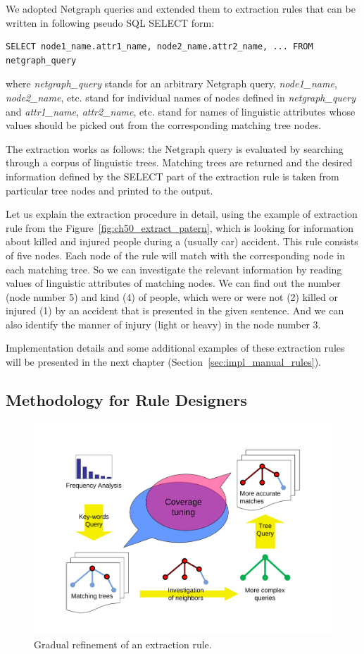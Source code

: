 We adopted Netgraph queries and extended them to extraction rules that can be written in following pseudo SQL SELECT form:

\begin{verbatim}
SELECT node1_name.attr1_name, node2_name.attr2_name, ... FROM netgraph_query
\end{verbatim}

where \emph{netgraph\_query} stands for an arbitrary Netgraph query, \emph{node1\_name}, \emph{node2\_name}, etc. stand for individual names of nodes defined in \emph{netgraph\_query} and \emph{attr1\_name}, \emph{attr2\_name}, etc. stand for names of linguistic attributes whose values should be picked out from the corresponding matching tree nodes.

The extraction works as follows: the Netgraph query is evaluated by searching through a corpus of linguistic trees. Matching trees are returned and the desired information defined by the SELECT part of the extraction rule is taken from particular tree nodes and printed to the output.

Let us explain the extraction procedure in detail, using the example of extraction rule from the Figure~\ref{fig:ch50_extract_patern}, which is looking for information about killed and injured people during a (usually car) accident. This rule consists of five nodes. Each node of the rule will match with the corresponding node in each matching tree. So we can investigate the relevant information by reading values of linguistic attributes of matching nodes. We can find out the number (node number 5) and kind (4) of people, which were or were not (2) killed or injured (1) by an accident that is presented in the given sentence. And we can also identify the manner of injury (light or heavy) in the node number 3.

Implementation details and some additional examples of these extraction rules will be presented in the next chapter (Section~\ref{sec:impl_manual_rules}).



\subsection{Methodology for Rule Designers} \label{sec:ch50_rules_design}

\begin{figure}
	\centering
		\includegraphics[angle=-90, width=0.5\hsize]{coverge_tuning}
	\caption{Gradual refinement of an extraction rule.}
	\label{fig:ch50_coverge_tuning}
\end{figure}


